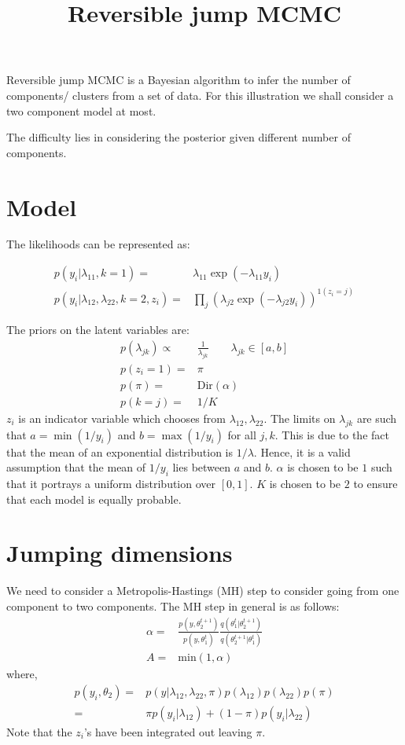 \documentclass{article}
\title{Reversible jump MCMC}
\date{}
\begin{document}
\maketitle




Reversible jump MCMC is a Bayesian algorithm to infer the number of components/ clusters from a set of data. For this illustration we shall consider a two component model at most.

The difficulty lies in considering the posterior given different number of components.

\section{Model}
The likelihoods can be represented as:

\begin{align}
p(y_i|\lambda_{11},k=1)=&\lambda_{11}\exp(-\lambda_{11}y_i)\\
p(y_i|\lambda_{12},\lambda_{22},k=2,z_i)=&\prod_j (\lambda_{j2}\exp(-\lambda_{j2}y_i))^{1(z_i=j)}
\end{align}


The priors on the latent variables are:
\begin{align}
p(\lambda_{jk})\propto & \frac{1}{\lambda_{jk}}\qquad \lambda_{jk}\in[a,b]\\
p(z_i=1)=&\pi\\
p(\pi) = & \text{Dir}(\alpha)\\
p(k=j)= & 1/K
\end{align}
$z_i$ is an indicator variable which chooses from $\lambda_{12},\lambda_{22}$. The limits on $\lambda_{jk}$ are such that $a=\min(1/y_i)$ and $b=\max(1/y_i)$ for all $j,k$. This is due to the fact that the mean of an exponential distribution is $1/\lambda$. Hence, it is a valid assumption that the mean of $1/y_i$ lies between $a$ and $b$. $\alpha$ is chosen to be $1$ such that it portrays a uniform distribution over $[0,1]$. $K$ is chosen to be $2$ to ensure that each model is equally probable.

\section{Jumping dimensions}
We need to consider a Metropolis-Hastings (MH) step to consider going from one component to two components. The MH step in general is as follows:
\begin{align}
\alpha = & \frac{p(y,\theta_2^{t+1})}{p(y,\theta_1^t)}\frac{q(\theta_1^t|\theta_2^{t+1})}{q(\theta_2^{t+1}|\theta_1^{t})}\\
A = & \text{min}\left(1,\alpha\right)
\end{align}
where,
\begin{align}
p(y_i,\theta_2)=& p(y|\lambda_{12},\lambda_{22},\pi)p(\lambda_{12})p(\lambda_{22})p(\pi)\\
=&\pi p(y_i|\lambda_{12})+(1-\pi) p(y_i|\lambda_{22})
\end{align}
Note that the $z_i$'s have been integrated out leaving $\pi$.
\end{document}
